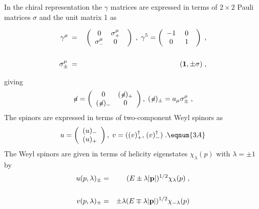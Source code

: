 In the chiral 
representation the $\gamma$ matrices are expressed
in terms of $2\times 2$ Pauli matrices $\sigma$ and the unit matrix 1 as
\begin{mathletters}
\begin{eqnarray}
\gamma^\mu \: & = &
\: \left(
\begin{array}{cc}
0 & \sigma^\mu_+ \\
\sigma^\mu_- & 0
\end{array} \; \; \right)\;,
\;\gamma^5= \left(
\begin{array}{cc}
-1 & \; 0\\
0 & \; 1
\end{array} \; \; \right) \;, \nonumber \\ & & \\
\sigma^\mu_{\pm} \:& = & \: ({\bf 1} ,\pm \sigma)\;, \nonumber
\end{eqnarray}
\end{mathletters}
giving
\begin{equation}
\not\!a= \left(
\begin{array}{cc}
0 & (\not\!a)_+\\
(\not\!a)_- & 0
\end{array}\right),\;(\not\!a)_\pm=a_\mu\sigma^\mu_\pm\;,
\end{equation}
The spinors are expressed in terms of two-component Weyl spinors as
\begin{equation}
u=\left(
\begin{array}{c}
(u)_-\\
(u)_+
\end{array}\right),\;v={\bf (}(v)^\dagger_+{\bf ,} \; (v)^\dagger_-{\bf )}\;.
\eqnum{3A}
\end{equation}
The Weyl spinors are given in terms of helicity eigenstates
$\chi_\lambda(p)$ with $\lambda=\pm1$ by
\begin{eqnarray}
u(p,\lambda)_\pm & = & (E\pm\lambda|{\bf p}|)^{1/2}\chi_\lambda(p)\;,
\nonumber \\ & & \\
v(p,\lambda)_\pm & = & \pm\lambda(E\mp\lambda|{\bf p}|)^{1/2}\chi
_{-\lambda}(p) \nonumber
\end{eqnarray}

%
%


